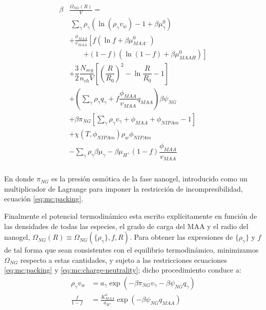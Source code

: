 	
	\begin{align}
		\begin{aligned}
			\beta&\frac{\Omega_{NG}(R)}{V}=\\& ~ \sum_{\gamma} \rho_\gamma\left(\ln\left(\rho_\gamma v_w\right) -1 + \beta\mu^0_\gamma\right) \\
			& + \frac{\phi_{MAA}}{v_{MAA}} \left[f(\ln f+ \beta\mu^0_{MAA^-})\right.\\
			&\qquad\left.+(1-f)(\ln (1-f)+\beta\mu^0_{MAAH})\right] \\
			& + \dfrac{3}{2}\dfrac{N_{seg}}{n_{ch} V}\left[\left(\dfrac{R}{R_0}\right)^2 - \ln\dfrac{R}{R_0} -1\right] \\
			& +  \left(\sum_{\gamma } {\rho_\gamma q_\gamma + f\dfrac{\phi_{MAA}}{v_{MAA}}q_{MAA}}\right)\beta\psi_{NG}\\
			& +\beta\pi_{NG} \left[ \sum_{\gamma } \rho_\gamma v_\gamma  + \phi_{MAA} + \phi_{NIPAm} -1 \right] \\
			& + \chi (T, \phi_{NIPAm})\rho_w \phi_{NIPAm} \\
			& -\sum_{\gamma }{\rho_\gamma\beta\mu_\gamma}
			-\beta\mu_{H^+}(1-f)\dfrac{\phi_{MAA}}{v_{MAA}}\\
		\end{aligned}
		\label{eq:mc:free-energy}
	\end{align}
	
	
	
	
	\noindent En donde $\pi_{NG}$ es la presi\'on osm\'otica de la fase nanogel, introducido como un multiplicador de Lagrange para imponer la restricci\'on de incompresibilidad, ecuaci\'on \ref{eq:mc:packing}.
	
	
	Finalmente el potencial termodin\'amico esta escrito expl\'icitamente en funci\'on de las densidades de todas las especies, el grado de carga del MAA y el radio del nanogel, $\Omega_{NG}(R)\equiv\Omega_{NG}(\{\rho_\gamma\},f,R)$.
	Para obtener las expresiones de $\{\rho_\gamma\}$ y $f$ de tal forma que sean consistentes con el equilibrio termodin\'amico, minimizamos $\Omega_{NG}$ respecto a estas cantidades, y  sujeto a las restricciones ecuaciones  \ref{eq:mc:packing} y  \ref{eq:mc:charge-neutrality}; dicho procedimiento conduce a: 
	\begin{align}
		\rho_\gamma v_w &= a_\gamma \exp(-\beta\pi_{NG}v_\gamma -\beta\psi_{NG}q_{\gamma})\\
		\frac{f}{1-f}&= \frac{K^0_{MAA}}{a_{H^+}}\exp(-\beta\psi_{NG}q_{MAA})\label{eq:mc:fcharge}
	\end{align}
	
